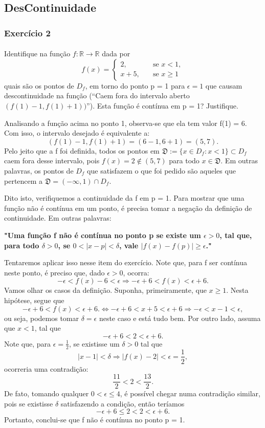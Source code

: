 \documentclass[Calculus1/exercícios_de_cálculo.tex]{subfiles}
\begin{document}
\subsection{DesContinuidade}
\subsubsection{Exercício 2}
\paragraph{} Identifique na função $f:\mathbb{R}\rightarrow\mathbb{R}$ dada por
$$
	f(x) = \left\{\begin{array}{ll}
		2,     & \quad \text{se } x < 1,  \\
		x + 5, & \quad \text{se } x\geq 1
	\end{array}\right.
$$
quais são os pontos de $D_f$, em torno do ponto p = 1 para $\epsilon = 1$ que causam descontinuidade na função (``Caem fora do intervalo aberto $(f(1) - 1, f(1) + 1))$''). Esta funç\~ao é contínua em p = 1? Justifique.
\begin{sol*}
	Analisando a função acima no ponto 1, observa-se que ela tem valor f(1) = 6. Com isso, o intervalo desejado é equivalente a:
	$$
		(f(1) - 1, f(1) + 1) = (6 - 1, 6 + 1) = (5, 7).
	$$
	Pelo jeito que a f foi definida, todos os pontos em $\mathfrak{D}:=\{x\in{D_{f}}: x < 1\} \subset{D_{f}}$ caem fora desse intervalo, pois $f(x) = 2\notin{(5, 7)}$ para todo $x\in\mathfrak{D}.$ Em outras palavras, os pontos de $D_f$ que satisfazem o que foi pedido são aqueles que pertencem a $\mathfrak{D} = (-\infty, 1)\cap{D_{f}}$.

	Dito isto, verifiquemos a continuidade da f em p = 1. Para mostrar que uma função não é contínua em um ponto, é precisa tomar a negaç\~ao da definiç\~ao de continuidade. Em outras palavras:

	\textbf{ "Uma função f não é contínua no ponto p se existe um $\epsilon > 0$, tal que, para todo $\delta > 0$, se $0 < |x - p| < \delta$, vale $|f(x) - f(p)|\geq\epsilon$."}

	Tentaremos aplicar isso nesse item do exercício. Note que, para f ser cont\'inua neste ponto, é preciso que, dado $\epsilon > 0$, ocorra:
	$$
		-\epsilon < f(x) - 6 < \epsilon \Rightarrow -\epsilon + 6 < f(x) < \epsilon + 6.
	$$
	Vamos olhar os casos da definição. Suponha, primeiramente, que $x\geq 1$. Nesta hipótese, segue que
	$$
		-\epsilon + 6 < f(x) < \epsilon + 6. \Leftrightarrow -\epsilon + 6 < x + 5 < \epsilon + 6 \Rightarrow -\epsilon < x - 1 < \epsilon,
	$$
	ou seja, podemos tomar $\delta = \epsilon$ neste caso e está tudo bem. Por outro lado, assuma que $x < 1$, tal que
	$$
		-\epsilon + 6 < 2 < \epsilon + 6.
	$$
	Note que, para $\epsilon = \frac{1}{2}$, se existisse um $\delta > 0$ tal que
	$$
		|x - 1| < \delta \Rightarrow |f(x) - 2| < \epsilon = \frac{1}{2},
	$$
	ocorreria uma contradição:
	$$
		\frac{11}{2} < 2 < \frac{13}{2}.
	$$
	De fato, tomando qualquer $0 < \epsilon \leq 4$, é possível chegar numa contradição similar, pois se existisse $\delta$ satisfazendo a condição, ent\~ao ter\'iamos
	$$
		-\epsilon + 6 \leq 2 < 2 < \epsilon + 6.
	$$
	Portanto, conclui-se que f não é contínua no ponto p = 1.
	\qedsymbol
\end{sol*}
\end{document}
